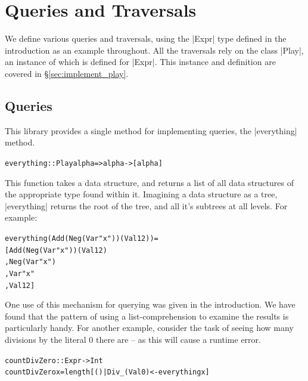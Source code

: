 \documentclass[preprint]{sigplanconf}
\newcommand{\pic}[1]{\texttt{[image: \#1.eps]}}
\newenvironment{code}{\begin{alltt}\small}{\end{alltt}}
\begin{document}
\section{Queries and Traversals}
\label{sec:use_play}

We define various queries and traversals, using the |Expr| type defined in the introduction as an example throughout. All the traversals rely on the class |Play|, an instance of which is defined for |Expr|. This instance and definition are covered in \S\ref{sec:implement_play}.

\subsection{Queries}

This library provides a single method for implementing queries, the |everything| method.

\begin{code}
everything :: Play alpha => alpha -> [alpha]
\end{code}

This function takes a data structure, and returns a list of all data structures of the appropriate type found within it. Imagining a data structure as a tree, |everything| returns the root of the tree, and all it's subtrees at all levels. For example:

\begin{code}
everything (Add (Neg (Var "x")) (Val 12)) =
    [Add (Neg (Var "x")) (Val 12)
    ,Neg (Var "x")
    ,Var "x"
    ,Val 12]
\end{code}

One use of this mechanism for querying was given in the introduction. We have found that the pattern of using a list-comprehension to examine the results is particularly handy. For another example, consider the task of seeing how many divisions by the literal 0 there are -- as this will cause a runtime error.

\begin{code}
countDivZero :: Expr -> Int
countDivZero x = length [() | Div _ (Val 0) <- everything x]
\end{code}
\end{document}
